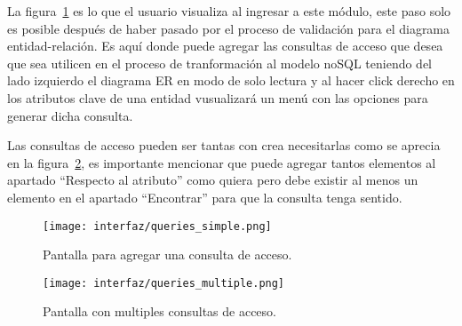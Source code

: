 La figura~\ref{img:app_simpleQuery} es lo que el usuario visualiza al ingresar a este módulo, este paso solo es posible después de haber pasado por el proceso de validación para el diagrama entidad-relación. Es aquí donde puede agregar las consultas de acceso que desea que sea utilicen en el proceso de tranformación al modelo noSQL teniendo del lado izquierdo el diagrama ER en modo de solo lectura y al hacer click derecho en los atributos clave de una entidad vusualizará un menú con las opciones para generar dicha consulta.

Las consultas de acceso pueden ser tantas con crea necesitarlas como se aprecia en la figura~\ref{img:app_multipleQueries}, es importante mencionar que puede agregar tantos elementos al apartado ``Respecto al atributo'' como quiera pero debe existir al menos un elemento en el apartado ``Encontrar'' para que la consulta tenga sentido.

\begin{figure}[H]
    \centering
    \texttt{[image: interfaz/queries\_simple.png]}
    \caption{Pantalla para agregar una consulta de acceso.}
    \label{img:app_simpleQuery}
\end{figure}

\begin{figure}[H]
    \centering
    \texttt{[image: interfaz/queries\_multiple.png]}
    \caption{Pantalla con multiples consultas de acceso.}
    \label{img:app_multipleQueries}
\end{figure}
